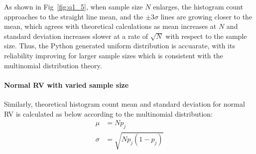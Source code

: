\documentclass[11pt, twocolumn]{article}
\begin{document}
As shown in Fig~\ref{fig:q1_5}, when sample size $N$ enlarges, the histogram count approaches to the straight line mean, and the $\pm 3\sigma$ lines are growing closer to the mean, which agrees with theoretical calculations as mean increases at $N$ and standard deviation increases slower at a rate of $\sqrt{N}$ with respect to the sample size.
Thus, the Python generated uniform distribution is accuarate, with its reliability improving for larger sample sizes which is consistent with the multinomial distribution theory.

\paragraph{Normal RV with varied sample size}
Similarly, theoretical histogram count mean and standard deviation for normal RV is calculated as below according to the multinomial distribution:
\begin{align*}
    \mu&=Np_j\\
    \sigma&=\sqrt{Np_j(1-p_j)}
\end{align*}
\vspace{-0.75em}
\end{document}
